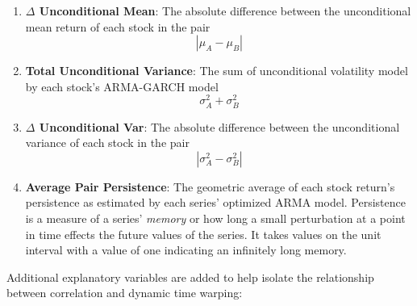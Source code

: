 \documentclass[12pt]{report}
\begin{document}
\begin{enumerate}
    \item \textbf{$\Delta$ Unconditional Mean}: The absolute difference between the unconditional mean return of each stock in the pair
    \begin{equation}
        |\mu_{A} - \mu_{B}|
    \end{equation}
    \item \textbf{Total Unconditional Variance}: The sum of unconditional volatility model by each stock's ARMA-GARCH model
    \begin{equation}
        \sigma^{2}_{A} + \sigma^{2}_{B}
    \end{equation}
    \item \textbf{$\Delta$ Unconditional Var}: The absolute difference between the unconditional variance of each stock in the pair
    \begin{equation}
        |\sigma^{2}_{A} - \sigma^{2}_{B}|
    \end{equation}
    \item \textbf{Average Pair Persistence}: The geometric average of each stock return's persistence as estimated by each series' optimized ARMA model. Persistence is a measure of a series' \textit{memory} or how long a small perturbation at a point in time effects the future values of the series. It takes values on the unit interval with a value of one indicating an infinitely long memory.
\end{enumerate}

Additional explanatory variables are added to help isolate the relationship between correlation and dynamic time warping:
\end{document}
